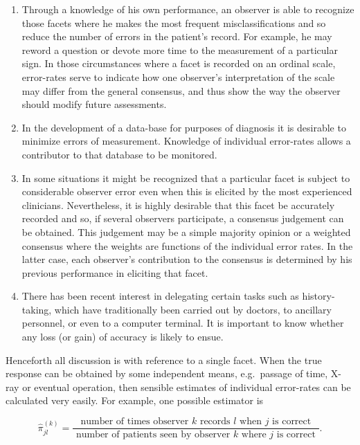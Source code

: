 \documentclass[
]{article}
\providecommand{\tightlist}{%
  \setlength{\itemsep}{0pt}\setlength{\parskip}{0pt}}
\begin{document}
\begin{enumerate}
\def\labelenumi{(\roman{enumi})}
\tightlist
\item
  Through a knowledge of his own performance, an observer is able to
  recognize those facets where he makes the most frequent
  misclassifications and so reduce the number of errors in the patient's
  record. For example, he may reword a question or devote more time to
  the measurement of a particular sign. In those circumstances where a
  facet is recorded on an ordinal scale, error-rates serve to indicate
  how one observer's interpretation of the scale may differ from the
  general consensus, and thus show the way the observer should modify
  future assessments.\\
\item
  In the development of a data-base for purposes of diagnosis it is
  desirable to minimize errors of measurement. Knowledge of individual
  error-rates allows a contributor to that database to be monitored.\\
\item
  In some situations it might be recognized that a particular facet is
  subject to considerable observer error even when this is elicited by
  the most experienced clinicians. Nevertheless, it is highly desirable
  that this facet be accurately recorded and so, if several observers
  participate, a consensus judgement can be obtained. This judgement may
  be a simple majority opinion or a weighted consensus where the weights
  are functions of the individual error rates. In the latter case, each
  observer's contribution to the consensus is determined by his previous
  performance in eliciting that facet.\\
\item
  There has been recent interest in delegating certain tasks such as
  history-taking, which have traditionally been carried out by doctors,
  to ancillary personnel, or even to a computer terminal. It is
  important to know whether any loss (or gain) of accuracy is likely to
  ensue.
\end{enumerate}

Henceforth all discussion is with reference to a single facet. When the
true response can be obtained by some independent means, e.g.~passage of
time, X-ray or eventual operation, then sensible estimates of individual
error-rates can be calculated very easily. For example, one possible
estimator is

\[
\hat {\pi} _ {j l} ^ {(k)} = \frac {\text { number   of   times   observer } k \text {   records } l \text {   when } j \text {   is   correct }}{\text { number   of   patients   seen   by   observer } k \text {   where } j \text {   is   correct }}. \tag {1.1}
\]
\end{document}
